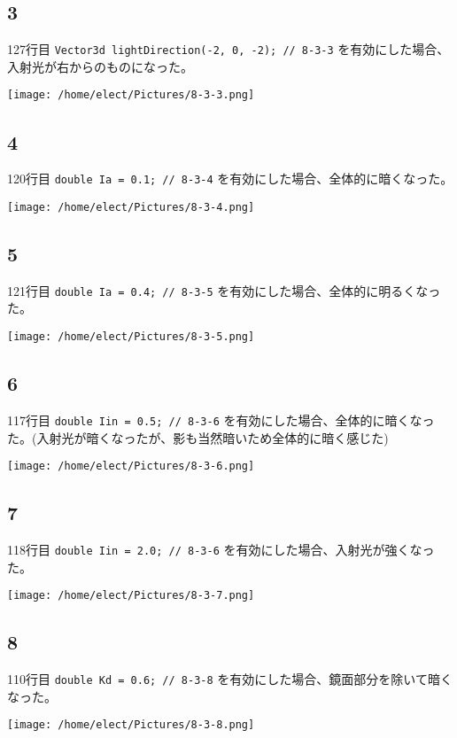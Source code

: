 \documentclass{scrartcl}
\begin{document}
\subsection{3}
\label{sec:orgc103b08}
127行目 \texttt{Vector3d lightDirection(-2, 0, -2); // 8-3-3} を有効にした場合、入射光が右からのものになった。\\
\begin{center}
\texttt{[image: /home/elect/Pictures/8-3-3.png]}
\end{center}
\subsection{4}
\label{sec:org8f8b637}
120行目 \texttt{double Ia  = 0.1; // 8-3-4} を有効にした場合、全体的に暗くなった。\\
\begin{center}
\texttt{[image: /home/elect/Pictures/8-3-4.png]}
\end{center}
\subsection{5}
\label{sec:org747fea3}
121行目 \texttt{double Ia  = 0.4; // 8-3-5} を有効にした場合、全体的に明るくなった。\\
\begin{center}
\texttt{[image: /home/elect/Pictures/8-3-5.png]}
\end{center}
\subsection{6}
\label{sec:org7103a06}
117行目 \texttt{double Iin = 0.5; // 8-3-6} を有効にした場合、全体的に暗くなった。(入射光が暗くなったが、影も当然暗いため全体的に暗く感じた)\\
\begin{center}
\texttt{[image: /home/elect/Pictures/8-3-6.png]}
\end{center}
\subsection{7}
\label{sec:org5f16c2b}
118行目 \texttt{double Iin = 2.0; // 8-3-6} を有効にした場合、入射光が強くなった。\\
\begin{center}
\texttt{[image: /home/elect/Pictures/8-3-7.png]}
\end{center}
\subsection{8}
\label{sec:orgbdc51eb}
110行目 \texttt{double Kd = 0.6;  // 8-3-8} を有効にした場合、鏡面部分を除いて暗くなった。\\
\begin{center}
\texttt{[image: /home/elect/Pictures/8-3-8.png]}
\end{center}
\end{document}

